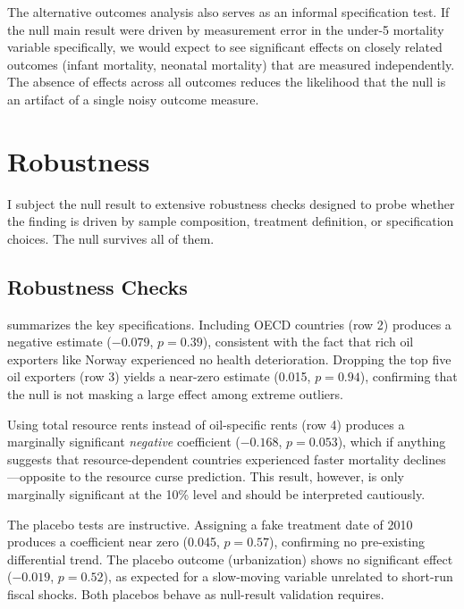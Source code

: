 \documentclass[12pt]{article}
\begin{document}
The alternative outcomes analysis also serves as an informal specification test. If the null main result were driven by measurement error in the under-5 mortality variable specifically, we would expect to see significant effects on closely related outcomes (infant mortality, neonatal mortality) that are measured independently. The absence of effects across all outcomes reduces the likelihood that the null is an artifact of a single noisy outcome measure.


\section{Robustness}
\label{sec:robustness}

I subject the null result to extensive robustness checks designed to probe whether the finding is driven by sample composition, treatment definition, or specification choices. The null survives all of them.

\subsection{Robustness Checks}



 summarizes the key specifications. Including OECD countries (row 2) produces a negative estimate ($-0.079$, $p = 0.39$), consistent with the fact that rich oil exporters like Norway experienced no health deterioration. Dropping the top five oil exporters (row 3) yields a near-zero estimate (0.015, $p = 0.94$), confirming that the null is not masking a large effect among extreme outliers.

Using total resource rents instead of oil-specific rents (row 4) produces a marginally significant \textit{negative} coefficient ($-0.168$, $p = 0.053$), which if anything suggests that resource-dependent countries experienced faster mortality declines---opposite to the resource curse prediction. This result, however, is only marginally significant at the 10\% level and should be interpreted cautiously.

The placebo tests are instructive. Assigning a fake treatment date of 2010 produces a coefficient near zero (0.045, $p = 0.57$), confirming no pre-existing differential trend. The placebo outcome (urbanization) shows no significant effect ($-0.019$, $p = 0.52$), as expected for a slow-moving variable unrelated to short-run fiscal shocks. Both placebos behave as null-result validation requires.
\end{document}
